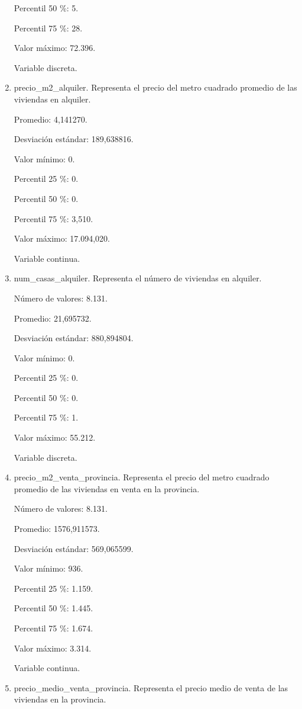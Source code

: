 \begin{enumerate}
	Percentil 50 \%: 5.
	
	Percentil 75 \%: 28.
	
	Valor máximo: 72.396.
	
	Variable discreta.

	\item precio\_m2\_alquiler. Representa el precio del metro cuadrado promedio de las viviendas en alquiler.
	
	Promedio: 4,141270.
	
	Desviación estándar: 189,638816.
	
	Valor mínimo: 0.
	
	Percentil 25 \%: 0.
	
	Percentil 50 \%: 0.
	
	Percentil 75 \%: 3,510.
	
	Valor máximo: 17.094,020.
	
	Variable continua.

	\item num\_casas\_alquiler. Representa el número de viviendas en alquiler.
	
	Número de valores: 8.131.
	
	Promedio: 21,695732.
	
	Desviación estándar: 880,894804.
	
	Valor mínimo: 0.
	
	Percentil 25 \%: 0.
	
	Percentil 50 \%: 0.
	
	Percentil 75 \%: 1.
	
	Valor máximo: 55.212.
	
	Variable discreta.

	\item precio\_m2\_venta\_provincia. Representa el precio del metro cuadrado promedio de las viviendas en venta en la provincia.
	
	Número de valores: 8.131.
	
	Promedio: 1576,911573.
	
	Desviación estándar: 569,065599.
	
	Valor mínimo: 936.
	
	Percentil 25 \%: 1.159.
	
	Percentil 50 \%: 1.445.
	
	Percentil 75 \%: 1.674.
	
	Valor máximo: 3.314.
	
	Variable continua.

	\item precio\_medio\_venta\_provincia. Representa el precio medio de venta de las viviendas en la provincia.
	

\end{enumerate}
